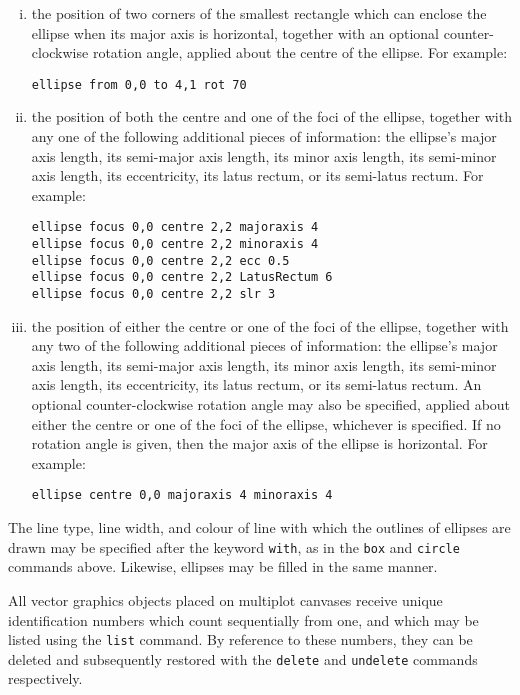 \begin{enumerate}[(i)]
\item the position of two corners of the smallest rectangle which can enclose
the ellipse when its major axis is horizontal, together with an optional
counter-clockwise rotation angle, applied about the centre of the ellipse.
For example:

\begin{verbatim}
ellipse from 0,0 to 4,1 rot 70
\end{verbatim}

\item the position of both the centre and one of the foci of the ellipse,
together with any one of the following additional pieces of information: the
ellipse's major axis length, its semi-major axis length, its minor axis length,
its semi-minor axis length, its eccentricity, its latus rectum, or its
semi-latus rectum.  For example:

\begin{verbatim}
ellipse focus 0,0 centre 2,2 majoraxis 4
ellipse focus 0,0 centre 2,2 minoraxis 4
ellipse focus 0,0 centre 2,2 ecc 0.5
ellipse focus 0,0 centre 2,2 LatusRectum 6
ellipse focus 0,0 centre 2,2 slr 3
\end{verbatim}

\item the position of either the centre or one of the foci of the ellipse,
together with any two of the following additional pieces of information: the
ellipse's major axis length, its semi-major axis length, its minor axis length,
its semi-minor axis length, its eccentricity, its latus rectum, or its
semi-latus rectum. An optional counter-clockwise rotation angle may also be
specified, applied about either the centre or one of the foci of the ellipse,
whichever is specified. If no rotation angle is given, then the major axis of
the ellipse is horizontal.  For example:

\begin{verbatim}
ellipse centre 0,0 majoraxis 4 minoraxis 4
\end{verbatim}
\end{enumerate}

The line type, line width, and colour of line with which the outlines of
ellipses are drawn may be specified after the keyword {\tt with}, as in the
{\tt box} and {\tt circle} commands above. Likewise, ellipses may be filled in
the same manner.

All vector graphics objects placed on multiplot canvases receive unique
identification numbers which count sequentially from one, and which may be
listed using the {\tt list} command.  By reference to these numbers, they can
be deleted and subsequently restored with the {\tt delete} and {\tt undelete}
commands respectively.



